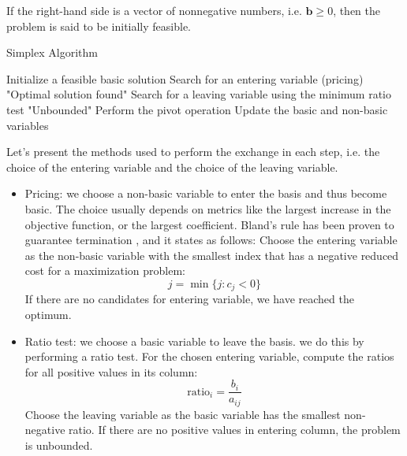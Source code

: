If the right-hand side is a vector of nonnegative numbers, i.e. $\mathbf{b} \geq 0 $, then
the problem is said to be initially feasible.


\begin{algorithm}
    \caption{Simplex Algorithm}
    \begin{algorithmic}
        \State Initialize a feasible basic solution
        \State Search for an entering variable (pricing)
        \State \Return "Optimal solution found"
        \EndIf
        \State Search for a leaving variable using the minimum ratio test
        \State \Return "Unbounded"
        \EndIf
        \State Perform the pivot operation
        \State Update the basic and non-basic variables
        \EndWhile
        \EndProcedure
    \end{algorithmic}
    \label{algo:simplex_tableau}
\end{algorithm}


Let's present the methods used to perform the exchange in each step, i.e. the choice of the entering
variable and the choice of the leaving variable.

\begin{itemize}
    \item Pricing: we choose a non-basic variable to enter the basis
          and thus become basic. The choice usually depends on metrics
          like the largest increase in the objective function, or the largest coefficient.
          Bland's rule has been proven to guarantee termination \parencite{chvatal1983linear}, and it states as follows:
          Choose the entering variable as the non-basic variable with
          the smallest index that has a negative reduced cost for a maximization problem:
          \[
              j = \min \{ j : c_j < 0 \}
          \]
          If there are no candidates for entering variable, we have reached the optimum.
    \item Ratio test: we choose a basic variable to leave the basis.
          we do this by performing a ratio test.
          For the chosen entering variable, compute the ratios for all positive values in its column:
          \[
              \text{ratio}_i = \frac{b_i}{a_{ij}}
          \]
          Choose the leaving variable as the basic variable has the smallest non-negative ratio.
          If there are no positive values in entering column, the problem is unbounded.
\end{itemize}


